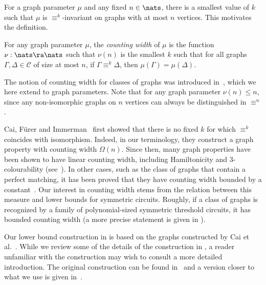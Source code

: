 \documentclass{toc}
\begin{document}
For a graph parameter
$\mu$ and any fixed $n \in \nats$, there is a smallest value of $k$ such that
$\mu$ is $\equiv^k$-invariant on graphs with at most $n$ vertices. This motivates the definition.
\begin{definition}\label{def:counting-width}
  For any graph parameter $\mu$, the \emph{counting width} of $\mu$ is the
  function $\nu : \nats \ra \nats$ such that $\nu(n)$
  is the smallest $k$ such that for all graphs $\Gamma, \Delta \in \mathcal{C}$ of size
  at most $n$, if $\Gamma \equiv^{k} \Delta$, then $\mu(\Gamma) = \mu(\Delta)$.
\end{definition}
The notion of counting width for classes of
graphs was introduced in~\cite{DawarW17}, which we here extend to graph
parameters. Note that for any graph parameter $\nu(n) \leq n$, since
any non-isomorphic graphs on $n$ vertices can %
always  %
be distinguished in $\equiv^n$.

Cai, F\"{u}rer and Immerman~\cite{CFI92} first showed that there is no fixed $k$
for which $\equiv^k$ coincides with isomorphism. Indeed, in our terminology,
they construct a graph property with counting width $\Omega(n)$. Since then,
many graph properties have been shown to have linear counting width, including
Hamiltonicity and 3-colourability
(see~\cite{AtseriasDO19}). In other cases, such as the class of graphs that
contain a perfect matching, it has been proved that they have counting width
bounded by a constant~\cite{AndersonDH15}. Our interest in counting width stems
from the relation between this measure and lower bounds for symmetric circuits.
Roughly, if a class of graphs is recognized by a family of
polynomial-sized symmetric threshold circuits, it has bounded counting width (a
more precise statement is given in
).

Our lower bound construction in  is based on the
graphs constructed by Cai et al.~\cite{CFI92}. While we review some of the
details of the construction in , a reader unfamiliar
with the construction may wish to consult a more detailed introduction. The
original construction can be found in~\cite{CFI92} and a version closer to what
we use is given in~\cite{DR07}.
\end{document}
